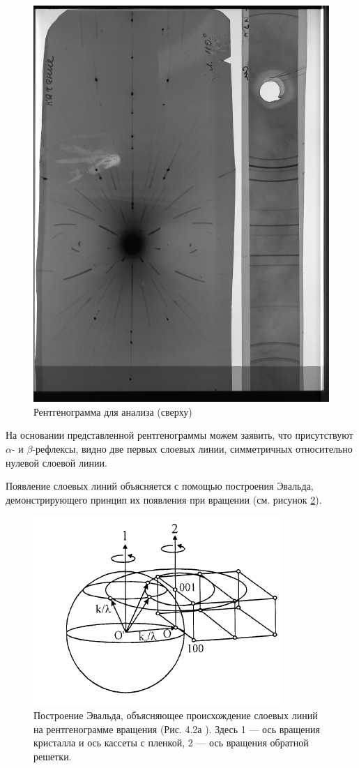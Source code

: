 \documentclass[a4paper, 12pt]{article}
\begin{document}
\begin{figure}[H]
	\centering
	\includegraphics[angle=-90, width=0.9\linewidth]{3a}
	\caption{Рентгенограмма для анализа (сверху)}
	\label{fig:rentgen}
\end{figure}

На основании представленной рентгенограммы можем заявить, что присутствуют $\alpha$- и $\beta$-рефлексы, видно две первых слоевых линии, симметричных относительно нулевой слоевой линии.

Появление слоевых линий объясняется с помощью построения Эвальда, демонстрирующего принцип их появления при вращении (см. рисунок \ref{fig:Evald_ex}).

\begin{figure}[H]
	\centering
	\includegraphics[width=0.7\linewidth]{Evald_ex}
	\caption{Построение Эвальда, объясняющее происхождение слоевых линий на рентгенограмме вращения (Рис. 4.2а \cite{Practicum}). Здесь 1 --- ось вращения кристалла и ось кассеты с пленкой, 2 --- ось вращения обратной решетки.}
	\label{fig:Evald_ex}
\end{figure}
\end{document}
